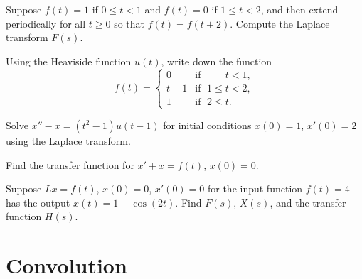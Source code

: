 \begin{exercise}
Suppose $f(t) = 1$ if $0 \leq t < 1$ and $f(t)=0$ if $1 \leq t < 2$, and
then extend periodically for all $t \geq 0$ so that $f(t)=f(t+2)$.  Compute the
Laplace transform $F(s)$.
\end{exercise}

\setcounter{exercise}{100}

\begin{exercise}
Using the Heaviside function $u(t)$, write down the function
\begin{equation*}
f(t) =
\begin{cases}
0 & \text{if } \; \phantom{1 \leq {}} t < 1  , \\
t-1 & \text{if } \; 1 \leq t < 2 , \\
1 & \text{if } \; 2 \leq t .
\end{cases}
\end{equation*}
\end{exercise}

\begin{exercise}
Solve $x''-x = (t^2-1) u(t-1)$ for initial conditions $x(0)=1$, $x'(0) = 2$
using the Laplace transform.
\end{exercise}
 
\begin{exercise}
Find the transfer function for 
$x' + x = f(t)$,
$x(0)=0$.
\end{exercise}

\begin{exercise}
Suppose $Lx = f(t)$, $x(0)=0$, $x'(0)=0$
for the input function $f(t) = 4$ has the output
$x(t) = 1 - \cos(2 t)$.  Find $F(s)$, $X(s)$, and the transfer function
$H(s)$.
\end{exercise}


\sectionnewpage
\section{Convolution}
\label{convolution:section}



